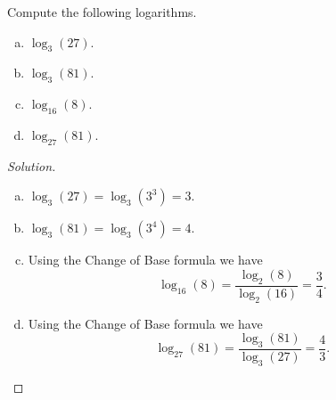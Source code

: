 \documentclass[12pt]{amsart}
\begin{document}
\begin{thm}[16 Points]\label{ex10}
  Compute the following logarithms.
  \begin{enumerate}[(a)]
  \item
    $\log_{3}(27)$.
  \item
    $\log_{3}(81)$.
  \item
    $\log_{16}(8)$.
  \item
    $\log_{27}(81)$.
  \end{enumerate}

  \begin{proof}[Solution]
    \begin{enumerate}[(a)]
    \item
      $\log_{3}(27) = \log_3(3^3) = 3$.
    \item
      $\log_{3}(81) = \log_3(3^4) = 4$.
    \item
      Using the Change of Base formula we have
      $$\log_{16}(8) = \frac{\log_2(8)}{\log_2(16)} = \frac{3}{4}.$$
    \item
      Using the Change of Base formula we have
      $$\log_{27}(81) = \frac{\log_3(81)}{\log_3(27)} = \frac{4}{3}.$$
    \end{enumerate}
  \end{proof}
\end{thm}
\end{document}
